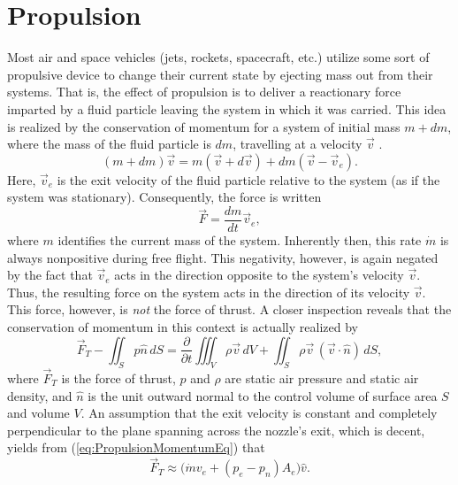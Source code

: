 \documentclass[11pt,dvipsnames]{thesis}
\begin{document}
\chapter{Propulsion}
Most air and space vehicles (jets, rockets, spacecraft, etc.) utilize some sort of propulsive device to change their current state by ejecting mass out from their systems. That is, the effect of propulsion is to deliver a reactionary force imparted by a fluid particle leaving the system in which it was carried. This idea is realized by the conservation of momentum for a system of initial mass $m + dm$, where the mass of the fluid particle is $dm$, travelling at a velocity $\vec{v}$ .
\begin{equation}
(m + dm) \vec{v} = m (\vec{v} + d\vec{v}) + dm (\vec{v} - \vec{v}_e).
\end{equation}
Here, $\vec{v}_e$ is the exit velocity of the fluid particle relative to the system (as if the system was stationary).
Consequently, the force is written
\begin{equation}
\vec{F} = \frac{dm}{dt} \vec{v}_e,
\end{equation}
where $m$ identifies the current mass of the system. Inherently then, this rate $\dot{m}$ is always nonpositive during free flight. This negativity, however, is again negated by the fact that $\vec{v}_e$ acts in the direction opposite to the system's velocity $\vec{v}$. Thus, the resulting force on the system acts in the direction of its velocity $\vec{v}$. This force, however, is \textit{not} the force of thrust. A closer inspection reveals that the conservation of momentum in this context is actually realized by
\begin{equation}
\vec{F}_T - \iint_S p \hat{n} \, dS = \frac{\partial}{\partial t} \iiint_V \rho \vec{v} \,dV + \iint_S \rho \vec{v} \,(\vec{v} \cdot \hat{n}) \,dS, \label{eq:PropulsionMomentumEq}
\end{equation}
where $\vec{F}_T$ is the force of thrust, $p$ and $\rho$ are static air pressure and static air density, and $\hat{n}$ is the unit outward normal to the control volume of surface area $S$ and volume $V$. An assumption that the exit velocity is constant and completely perpendicular to the plane spanning across the nozzle's exit, which is decent, yields from (\ref{eq:PropulsionMomentumEq}) that
\begin{equation}
\vec{F}_T \approx \big(\dot{m} v_e + (p_e - p_n) A_e\big) \hat{v}. \label{eq:PropulsionThrustAppx}
\end{equation}
\end{document}
